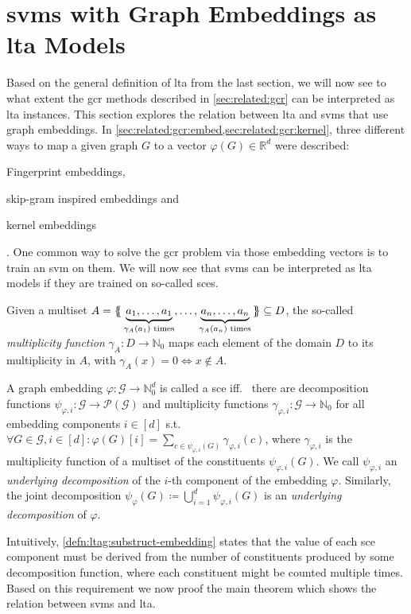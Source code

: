 \section{\acsp*{svm} with Graph Embeddings as \acs*{lta} Models}%
\label{sec:ltag:formulation:svm}

Based on the general definition of \ac{lta} from the last section, we will now see to what extent the \ac{gcr} methods described in \cref{sec:related:gcr} can be interpreted as \ac{lta} instances.
This section explores the relation between \ac{lta} and \acp{svm} that use graph embeddings.
In \cref{sec:related:gcr:embed,sec:related:gcr:kernel}, three different ways to map a given graph $G$ to a vector $\varphi(G) \in \mathbb{R}^d$ were described:
\begin{enumerate*}[label={\circled{\small\arabic*}}]
	\item Fingerprint embeddings,
	\item skip-gram inspired embeddings and
	\item kernel embeddings
\end{enumerate*}.
One common way to solve the \ac{gcr} problem via those embedding vectors is to train an \ac{svm} on them.
We will now see that \acp{svm} can be interpreted as \ac{lta} models if they are trained on so-called \acp*{sce}.
\begin{defn}
	Given a multiset $A = \ldblbrace \underbrace{a_1, \dots, a_1}_{\gamma_A(a_1)\text{ times}},\allowbreak \dots, \underbrace{a_n, \dots, a_n}_{\gamma_A(a_n)\text{ times}} \rdblbrace \subseteq D$, the so-called \textit{multiplicity function} $\gamma_A: D \to \mathbb{N}_0$ maps each element of the domain $D$ to its multiplicity in $A$, with $\gamma_A(x) = 0 \Leftrightarrow x \notin A$.
\end{defn}
\begin{defn}\label{defn:ltag:substruct-embedding}
	A graph embedding $\varphi: \mathcal{G} \to \mathbb{N}_0^{d}$ is called a \ac{sce} iff.\ %
	there are decomposition functions $\psi_{\varphi, i}: \mathcal{G} \to \mathcal{P}(\mathcal{G})$ and multiplicity functions $\gamma_{\varphi, i}: \mathcal{G} \to \mathbb{N}_0$ for all embedding components $i \in [d]$ s.t.\ %
	$\forall G \in \mathcal{G}, i \in [d]: \varphi(G)[i] = \sum_{c \in \psi_{\varphi, i}(G)} \gamma_{\varphi, i}(c)$, where $\gamma_{\varphi, i}$ is the multiplicity function of a multiset of the constituents $\psi_{\varphi, i}(G)$.
	We call $\psi_{\varphi, i}$ an \textit{underlying decomposition} of the $i$-th component of the embedding $\varphi$.
	Similarly, the joint decomposition $\psi_{\varphi}(G) \coloneqq \bigcup_{i=1}^d \psi_{\varphi,i}(G)$ is an \textit{underlying decomposition} of $\varphi$.
\end{defn}
Intuitively, \cref{defn:ltag:substruct-embedding} states that the value of each \ac{sce} component must be derived from the number of constituents produced by some decomposition function, where each constituent might be counted multiple times.
Based on this requirement we now proof the main theorem which shows the relation between \acp{svm} and \ac{lta}.


